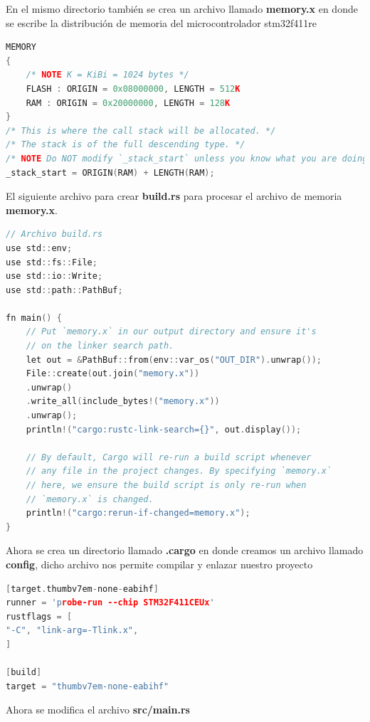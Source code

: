 En el mismo directorio también se crea un archivo llamado \textbf{memory.x} en donde se escribe la distribución de memoria del microcontrolador stm32f411re

\begin{lstlisting}[language=c]
MEMORY
{
	/* NOTE K = KiBi = 1024 bytes */
	FLASH : ORIGIN = 0x08000000, LENGTH = 512K
	RAM : ORIGIN = 0x20000000, LENGTH = 128K
}
/* This is where the call stack will be allocated. */
/* The stack is of the full descending type. */
/* NOTE Do NOT modify `_stack_start` unless you know what you are doing */
_stack_start = ORIGIN(RAM) + LENGTH(RAM);
\end{lstlisting}

El siguiente archivo para crear \textbf{build.rs} para procesar el archivo de memoria \textbf{memory.x}.

\begin{lstlisting}[language=c]
// Archivo build.rs
use std::env;
use std::fs::File;
use std::io::Write;
use std::path::PathBuf;

fn main() {
	// Put `memory.x` in our output directory and ensure it's
	// on the linker search path.
	let out = &PathBuf::from(env::var_os("OUT_DIR").unwrap());
	File::create(out.join("memory.x"))
	.unwrap()
	.write_all(include_bytes!("memory.x"))
	.unwrap();
	println!("cargo:rustc-link-search={}", out.display());
	
	// By default, Cargo will re-run a build script whenever
	// any file in the project changes. By specifying `memory.x`
	// here, we ensure the build script is only re-run when
	// `memory.x` is changed.
	println!("cargo:rerun-if-changed=memory.x");
}
\end{lstlisting} 

Ahora se crea un directorio llamado \textbf{.cargo} en donde creamos un archivo llamado \textbf{config}, dicho archivo nos permite compilar y enlazar nuestro proyecto


\begin{lstlisting}[language=c]
[target.thumbv7em-none-eabihf]
runner = 'probe-run --chip STM32F411CEUx'
rustflags = [
"-C", "link-arg=-Tlink.x",
]

[build]
target = "thumbv7em-none-eabihf"	
\end{lstlisting}


Ahora se modifica el archivo \textbf{src/main.rs} 

